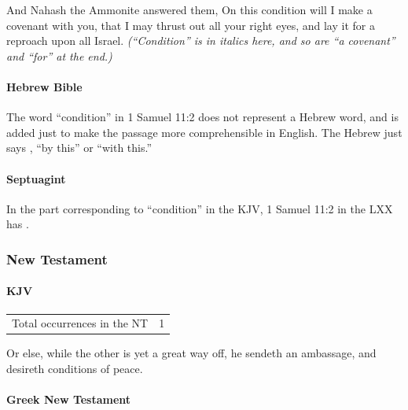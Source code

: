 			\begin{compactdesc}
				\item[1 Samuel 11:2] And Nahash the Ammonite answered them, On this condition will I make a covenant with you, that I may thrust out all your right eyes, and lay it for a reproach upon all Israel. \textit{(``Condition'' is in italics here, and so are ``a covenant'' and ``for'' at the end.)}
			\end{compactdesc}
			
		\paragraph{Hebrew Bible}
			\label{CONDITION-HEBREW}
		
			The word ``condition'' in 1 Samuel 11:2 does not represent a Hebrew word, and is added just to make the passage more comprehensible in English. The Hebrew just says , ``by this'' or ``with this.''
			
		\paragraph{Septuagint}
			\label{CONDITION-LXX}
		
			In the part corresponding to ``condition'' in the KJV, 1 Samuel 11:2 in the LXX has .
		
	\subsubsection{New Testament} %
		\label{CONDITION-NT}
	
		\paragraph{KJV}
			\label{CONDITION-NT-KJV}
			
	
			\begin{tabular}{ll}
				Total occurrences in the NT & 1
			\end{tabular}
			
			\begin{compactdesc}
				\item[Luke 14:32] Or else, while the other is yet a great way off, he sendeth an ambassage, and desireth conditions of peace.
			\end{compactdesc}
			
		\paragraph{Greek New Testament} %
			\label{CONDITION-GREEK}
		
